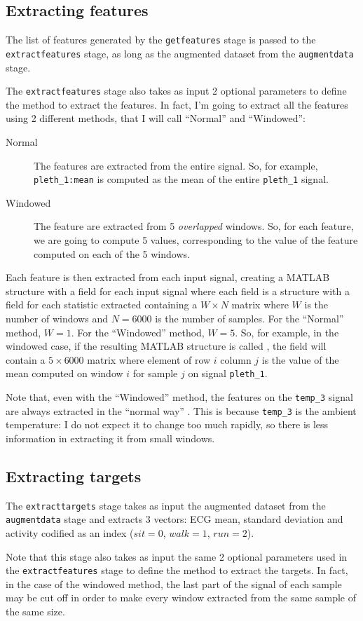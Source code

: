 \subsection{Extracting features}\label{subsec:extractfeaturesstage}

The list of features generated by the \texttt{getfeatures} stage is passed to
the \texttt{extractfeatures} stage, as long as the augmented dataset from the
\texttt{augmentdata} stage.

The \texttt{extractfeatures} stage also takes as input 2 optional parameters to
define the method to extract the features. In fact, I'm going to extract all
the features using 2 different methods, that I will call ``Normal'' and
``Windowed'':
\begin{description}
\item[Normal] The features are extracted from the entire signal. So, for
	example, \texttt{pleth\_1:mean} is computed as the mean of the entire
	\texttt{pleth\_1} signal.
\item[Windowed] The feature are extracted from 5 \emph{overlapped} windows. So,
	for each feature, we are going to compute 5 values, corresponding to
	the value of the feature computed on each of the 5 windows.
\end{description}

Each feature is then extracted from each input signal, creating a MATLAB
structure with a field for each input signal where each field is a structure
with a field for each statistic extracted containing a \(W \times N\) matrix
where \(W\) is the number of windows and \(N = 6000\) is the number of samples.
For the ``Normal'' method, \(W = 1\). For the ``Windowed'' method, \(W = 5\).
So, for example, in the windowed case, if the resulting MATLAB structure is
called , the field  will contain a
\(5 \times 6000\) matrix where element of row \(i\) column \(j\) is the value
of the mean computed on window \(i\) for sample \(j\) on signal
\texttt{pleth\_1}.

Note that, even with the ``Windowed'' method, the features on the
\texttt{temp\_3} signal are always extracted in the ``normal way'' . This is because \texttt{temp\_3} is the ambient temperature: I
do not expect it to change too much rapidly, so there is less information in
extracting it from small windows.

\subsection{Extracting targets}\label{subsec:extracttargetsstage}

The \texttt{extracttargets} stage takes as input the augmented dataset from the
\texttt{augmentdata} stage and extracts 3 vectors: ECG mean, standard deviation
and activity codified as an index (\(sit = 0\), \(walk = 1\), \(run = 2\)).

Note that this stage also takes as input the same 2 optional parameters used in
the \texttt{extractfeatures} stage to define the method to extract the targets.
In fact, in the case of the windowed method, the last part of the signal of
each sample may be cut off in order to make every window extracted from the
same sample of the same size.
